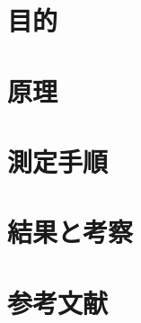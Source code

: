 \documentclass[11pt,a4j]{jsarticle}
\title{}
\author{1413176 三村幸祐}
\date{ \, }
\begin{document}
  
  
  
 \section{目的}
  
  
  
 \section{原理}
  
  
  
 \section{測定手順}
  
  
  
 \section{結果と考察}
  
  
  
 \section{参考文献}
  
  
  
\end{document}
